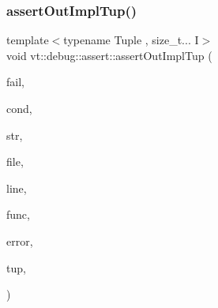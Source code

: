\mbox{\label{namespacevt_1_1debug_1_1assert_ab6abd4cf4f3c08bc228bb426ed920bce}} 
\subsubsection{\texorpdfstring{assert\+Out\+Impl\+Tup()}{assertOutImplTup()}}
{\footnotesize\ttfamily template$<$typename Tuple , size\+\_\+t... I$>$ \\
void vt\+::debug\+::assert\+::assert\+Out\+Impl\+Tup (\begin{DoxyParamCaption}\item[{bool}]{fail,  }\item[{std\+::string const}]{cond,  }\item[{std\+::string const \&}]{str,  }\item[{std\+::string const \&}]{file,  }\item[{int const}]{line,  }\item[{std\+::string const \&}]{func,  }\item[{\hyperlink{namespacevt_a793764d753923abc3d32929870beb485}{Error\+Code\+Type}}]{error,  }\item[{Tuple \&\&}]{tup,  }\item[{std\+::index\+\_\+sequence$<$ I... $>$}]{ }\end{DoxyParamCaption})\hspace{0.3cm}{\ttfamily [inline]}}

\mbox{\label{namespacevt_1_1debug_1_1assert_ae34a8ee24e780d775c6abf3938669ffb}} 
